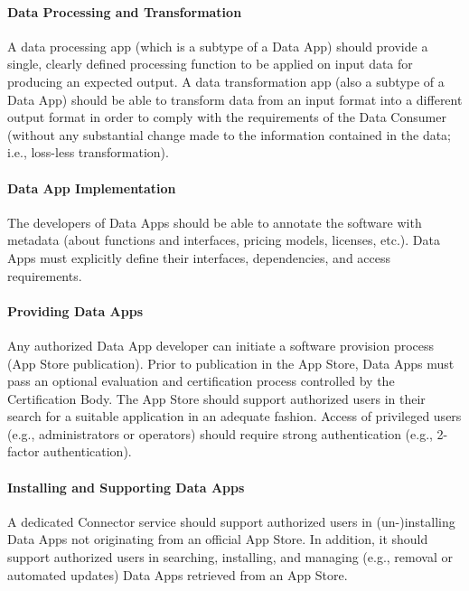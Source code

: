 \paragraph{Data Processing and Transformation\\}
A data processing app (which is a subtype of a Data App) should provide a single, clearly defined processing function to be applied on input data for producing an expected output. A data transformation app (also a subtype of a Data App) should be able to transform data from an input format into a different output format in order to comply with the requirements of the Data Consumer (without any substantial change made to the information contained in the data; i.e., loss-less transformation). 

\paragraph{Data App Implementation\\}
The developers of Data Apps should be able to annotate the software with metadata (about functions and interfaces, pricing models, licenses, etc.). Data Apps must explicitly define their interfaces, dependencies, and access requirements.


\paragraph{Providing Data Apps\\}
Any authorized Data App developer can initiate a software provision process (App Store publication). Prior to publication in the App Store, Data Apps must pass an optional evaluation and certification process controlled by the Certification Body. The App Store should support authorized users in their search for a suitable application in an adequate fashion. Access of privileged users (e.g., administrators or operators) should require strong authentication (e.g., 2-factor authentication).


\paragraph{Installing and Supporting Data Apps\\}
A dedicated Connector service should support authorized users in (un-)installing Data Apps not originating from an official App Store. In addition, it should support authorized users in searching, installing, and managing (e.g., removal or automated updates) Data Apps retrieved from an App Store.


